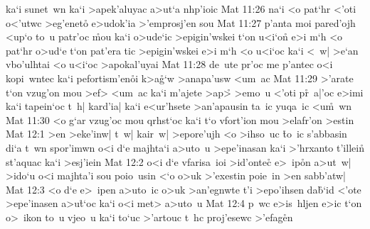 ka`i
sunet~wn
ka`i
>apek'aluyac
a>ut`a
nhp'ioic\bibvsend
\vs Mat 11:26
na`i
<o
pat`hr
<'oti
o<'utwc
>eg'eneto\r{}
e>udok'ia
>'emprosj'en
sou\bibvsend
\vs Mat 11:27
p'anta
moi
pared'ojh
<up`o
to~u
patr'oc
\r{m}ou
ka`i
o>ude`ic
>epigin'wskei
t`on
u<i`on\r{}
e>i
m`h
<o
pat`hr
o>ud`e
t`on
pat'era
tic
>epigin'wskei
e>i
m`h
<o
u<i`oc
ka`i
<~w|
>e`an
vbo'ulhtai
<o
u<i`oc
>apokal'uyai\bibvsend
\vs Mat 11:28
de~ute
pr'oc
me
p'antec
o<i
kopi~wntec
ka`i
pefortism'en\r{o}i
k>a\r{g}`w
>anapa'usw
<um~ac\bibvsend
\vs Mat 11:29
>'arate
t`on
vzug'on
mou
>ef>
<um~ac
ka`i
m'ajete
>ap>\r{}
>emo~u
<'oti
p\r{r}~a|'oc
e>imi
ka`i
tapein`oc
t~h|
kard'ia|
ka`i
e<ur'hsete
>an'apausin
ta~ic
yuqa~ic
<u\r{m}~wn\bibvsend
{}
\vs Mat 11:30
<o
g`ar
vzug'oc
mou
qrhst`oc
ka`i
t`o
vfort'ion
mou
>elafr'on
>estin\bibvsend
\vs Mat 12:1
>en
>eke'inw|
t~w|
kair~w|
>epore'ujh
<o
>ihso~uc
\r{t}o~ic
s'abbasin
di`a
t~wn
spor'imwn
o<i
d`e
majhta`i
a>uto~u
>epe'inasan
ka`i
>'hrxanto
t'illein\r{}
st'aquac
ka`i
>esj'iein\bibvsend
\vs Mat 12:2
o<i
d`e
vfarisa~ioi
>id'onte\r{c}
e>~ip\r{o}n
a>ut~w|
>ido`u
o<i
majhta'i
sou
poio~usin
<`o
o>uk
>'exestin
poie~in
>en
sabb'atw|\bibvsend
\vs Mat 12:3
<o
d`e
e>~ipen
a>uto~ic
o>uk
>an'egnwte
t'i
>epo'ihsen
da\r{b}`id
<'ote
>epe'inasen
a>u\r{t}`oc
ka`i
o<i
met>
a>uto~u\bibvsend
\vs Mat 12:4
p~wc
e>is~hljen
e>ic
t`on
o>~ikon
to~u
vjeo~u
ka`i
to`uc
>'artouc
t~hc
proj'esewc
>'efag\r{e}n
